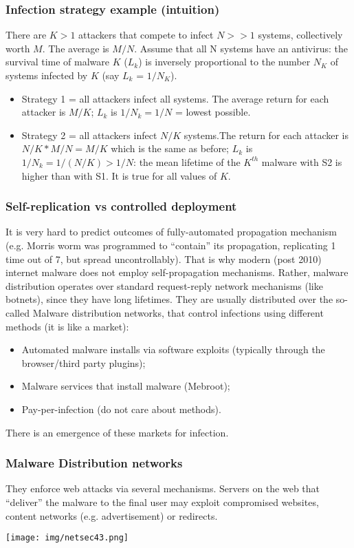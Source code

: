 \documentclass[a4paper, 10pt, titlepage]{article}
\begin{document}
\subsubsection*{Infection strategy example (intuition)}
There are $K>1$ attackers that compete to infect $N>>1$ systems, collectively worth $M$. The average is $M/N$. Assume that all N systems have an antivirus: the survival time of malware $K$ ($L_k$) is inversely proportional to the number $N_K$ of systems infected by $K$ (say $L_k$ = $1/N_K$).
\begin{itemize}
	\item Strategy 1 = all attackers infect all systems. The average return for each attacker is $M/K$; $L_k$ is $1/N_k =1/N$ = lowest possible.
	\item Strategy 2 = all attackers infect $N/K$ systems.The return for each attacker is $N/K*M/N=M/K$ which is the same as before; $L_k$ is $1/N_k = 1/(N/K) > 1/N$: the mean lifetime of the $K^{th}$ malware with S2 is higher than with S1. It is true for all values of $K$.
\end{itemize}

\subsubsection*{Self-replication vs controlled deployment}
It is very hard to predict outcomes of fully-automated propagation mechanism (e.g. Morris worm was programmed to “contain” its propagation, replicating 1 time out of 7, but spread uncontrollably). That is why modern (post 2010) internet malware does not employ self-propagation mechanisms. Rather, malware distribution operates over standard request-reply network mechanisms (like botnets), since they have long lifetimes. They are usually distributed over the so-called Malware distribution networks, that control infections using different methods (it is like a market):
\begin{itemize}
	\item Automated malware installs via software exploits (typically through the browser/third party plugins);
	\item Malware services that install malware (Mebroot);
	\item Pay-per-infection (do not care about methods).
\end{itemize}
There is an emergence of these markets for infection.

\subsubsection*{Malware Distribution networks}
They enforce web attacks via several mechanisms. Servers on the web that “deliver” the malware to the final user may exploit compromised websites, content networks (e.g. advertisement) or redirects.
\begin{center}
	\texttt{[image: img/netsec43.png]}
\end{center}
\end{document}
